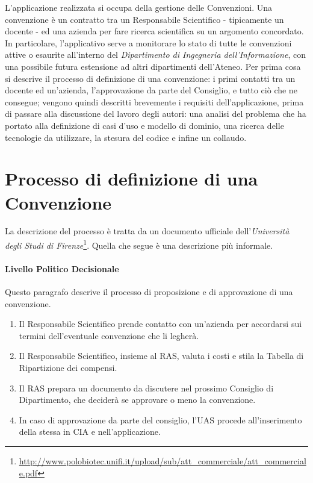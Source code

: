 L'applicazione realizzata si occupa della gestione delle Convenzioni. Una convenzione è un contratto tra un Responsabile Scientifico
- tipicamente un docente - ed una azienda per fare ricerca scientifica su un argomento concordato.
In particolare, l'applicativo serve a monitorare lo stato di tutte le convenzioni attive o esaurite all'interno del
\textsl{Dipartimento di Ingegneria dell'Informazione}, con una possibile futura estensione ad altri dipartimenti dell'Ateneo.\newline
Per prima cosa si descrive il processo di definizione di una convenzione: i primi contatti tra un docente ed un'azienda,
l'approvazione da parte del Consiglio, e tutto ciò che ne consegue; 
vengono quindi descritti brevemente i requisiti dell'applicazione, prima di passare alla discussione del lavoro degli autori:
una analisi del problema che ha portato alla definizione di casi d'uso e modello di dominio, una ricerca delle tecnologie da utilizzare, la stesura del codice
e infine un collaudo.


\section{Processo di definizione di una Convenzione}
La descrizione del processo è tratta da un documento ufficiale dell'\textsl{Università degli Studi di Firenze}\footnote{\url{http://www.polobiotec.unifi.it/upload/sub/att_commerciale/att_commerciale.pdf}}. Quella che segue è una descrizione più informale.

\paragraph{Livello Politico Decisionale}
Questo paragrafo descrive il processo di proposizione e di approvazione di una convenzione.\newline

\begin{enumerate}
\item Il Responsabile Scientifico prende contatto con un'azienda per accordarsi sui termini dell'eventuale convenzione che li legherà.
\item
Il Responsabile Scientifico, insieme al RAS, valuta i costi e stila la Tabella di Ripartizione dei compensi.
\item Il RAS prepara un documento da discutere nel prossimo Consiglio di Dipartimento, che deciderà se approvare o meno la convenzione.
\item In caso di approvazione da parte del consiglio, l'UAS procede all'inserimento della stessa in CIA e nell'applicazione.
\end{enumerate}

